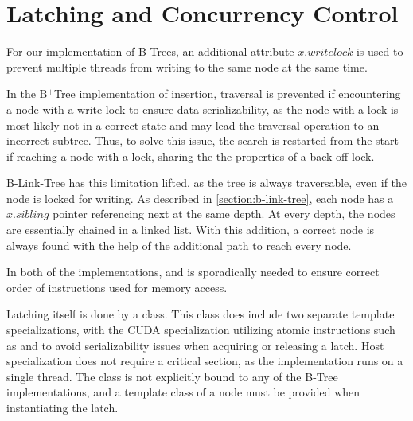 \section{Latching and Concurrency Control}

For our implementation of B-Trees, an additional attribute $x.writelock$ is used to prevent multiple threads from writing to the same node at the same time.

In the B$^+$Tree implementation of insertion, traversal is prevented if encountering a node with a write lock to ensure data serializability, as the node with a lock is most likely not in a correct state and may lead the traversal operation to an incorrect subtree. Thus, to solve this issue, the search is restarted from the start if reaching a node with a lock, sharing the the properties of a back-off lock.

B-Link-Tree has this limitation lifted, as the tree is always traversable, even if the node is locked for writing. As described in \cref{section:b-link-tree}, each node has a $x.sibling$ pointer referencing next at the same depth. At every depth, the nodes are essentially chained in a linked list. With this addition, a correct node is always found with the help of the additional path to reach every node.

In both of the implementations,  and  is sporadically needed to ensure correct order of instructions used for memory access.

Latching itself is done by a  class. This class does include two separate template specializations, with the CUDA specialization utilizing atomic instructions such as  and  to avoid serializability issues when acquiring or releasing a latch. Host specialization does not require a critical section, as the implementation runs on a single thread. The class is not explicitly bound to any of the B-Tree implementations, and a template class of a node must be provided when instantiating the latch. 


